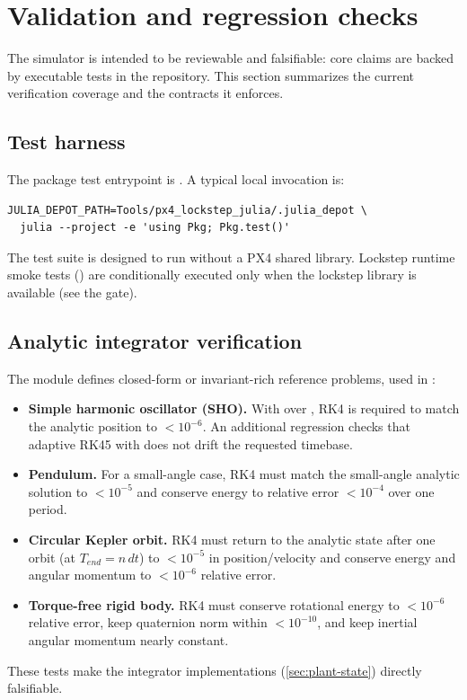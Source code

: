 \section{Validation and regression checks}
\label{sec:validation}

The simulator is intended to be reviewable and falsifiable: core claims are backed by executable tests in the repository. This section summarizes the current verification coverage and the contracts it enforces.

\subsection{Test harness}

The package test entrypoint is . A typical local invocation is:
\begin{lstlisting}
JULIA_DEPOT_PATH=Tools/px4_lockstep_julia/.julia_depot \
  julia --project -e 'using Pkg; Pkg.test()'
\end{lstlisting}

The test suite is designed to run without a PX4 shared library. Lockstep runtime smoke tests () are conditionally executed only when the lockstep library is available (see the  gate).

\subsection{Analytic integrator verification}

The module  defines closed-form or invariant-rich reference problems, used in :
\begin{itemize}[leftmargin=*,itemsep=2pt]
  \item \textbf{Simple harmonic oscillator (SHO).} With  over , RK4 is required to match the analytic position to \(<10^{-6}\). An additional regression checks that adaptive RK45 with  does not drift the requested timebase.
  \item \textbf{Pendulum.} For a small-angle case, RK4 must match the small-angle analytic solution to \(<10^{-5}\) and conserve energy to relative error \(<10^{-4}\) over one period.
  \item \textbf{Circular Kepler orbit.} RK4 must return to the analytic state after one orbit (at \(T_{end}=n\,dt\)) to \(<10^{-5}\) in position/velocity and conserve energy and angular momentum to \(<10^{-6}\) relative error.
  \item \textbf{Torque-free rigid body.} RK4 must conserve rotational energy to \(<10^{-6}\) relative error, keep quaternion norm within \(<10^{-10}\), and keep inertial angular momentum nearly constant.
\end{itemize}
These tests make the integrator implementations (\cref{sec:plant-state}) directly falsifiable.


